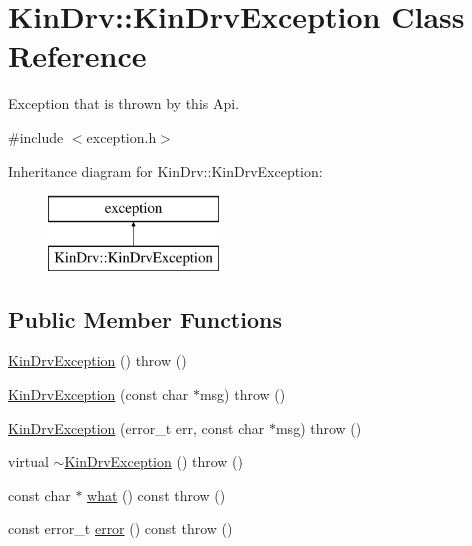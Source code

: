 \hypertarget{classKinDrv_1_1KinDrvException}{\section{Kin\+Drv\+:\+:Kin\+Drv\+Exception Class Reference}
\label{classKinDrv_1_1KinDrvException}
}


Exception that is thrown by this Api.  




{\ttfamily \#include $<$exception.\+h$>$}

Inheritance diagram for Kin\+Drv\+:\+:Kin\+Drv\+Exception\+:\begin{figure}[H]
\begin{center}
\leavevmode
\includegraphics[height=2.000000cm]{classKinDrv_1_1KinDrvException}
\end{center}
\end{figure}
\subsection*{Public Member Functions}
\begin{DoxyCompactItemize}
\item 
\hyperlink{classKinDrv_1_1KinDrvException_a9de93afe0b9cb2789af4e1a90703c1ed}{Kin\+Drv\+Exception} ()  throw ()
\item 
\hyperlink{classKinDrv_1_1KinDrvException_aac037b5e448dad9cea4f30623514a853}{Kin\+Drv\+Exception} (const char $\ast$msg)  throw ()
\item 
\hyperlink{classKinDrv_1_1KinDrvException_ae4d643477d23b3f04119bc192fbaa42b}{Kin\+Drv\+Exception} (error\+\_\+t err, const char $\ast$msg)  throw ()
\item 
virtual \hyperlink{classKinDrv_1_1KinDrvException_aab87e6e6ddbf93de108d0fbd22543348}{$\sim$\+Kin\+Drv\+Exception} ()  throw ()
\item 
const char $\ast$ \hyperlink{classKinDrv_1_1KinDrvException_a7d1075b836e030e0c358821a8b26aaf0}{what} () const   throw ()
\item 
const error\+\_\+t \hyperlink{classKinDrv_1_1KinDrvException_af7f16d1830e8d54f5f373a743448011f}{error} () const   throw ()
\end{DoxyCompactItemize}


